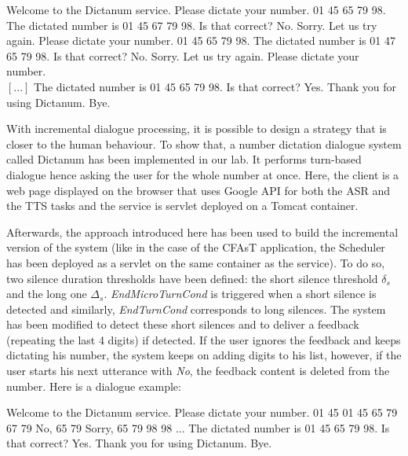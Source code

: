         \begin{dialogue}
        	 Welcome to the Dictanum service. Please dictate your number.
             01 45 65 79 98.
             The dictated number is 01 45 67 79 98. Is that correct?
             No.
             Sorry. Let us try again. Please dictate your number.
             01 45 65 79 98.
             The dictated number is 01 47 65 79 98. Is that correct?
             No.
             Sorry. Let us try again. Please dictate your number. \\
            $\left[...\right]$
             The dictated number is 01 45 65 79 98. Is that correct?
             Yes.
             Thank you for using Dictanum. Bye.
        \end{dialogue}
        
        With incremental dialogue processing, it is possible to design a strategy that is closer to the human behaviour. To show that, a number dictation dialogue system called Dictanum has been implemented in our lab. It performs turn-based dialogue hence asking the user for the whole number at once. Here, the client is a web page displayed on the browser that uses Google API for both the ASR and the TTS tasks and the service is servlet deployed on a Tomcat container.
        
        Afterwards, the approach introduced here has been used to build the incremental version of the system (like in the case of the CFAsT application, the Scheduler has been deployed as a servlet on the same container as the service). To do so, two silence duration thresholds have been defined: the short silence threshold $\delta_s$ and the long one $\Delta_s$. \textit{EndMicroTurnCond} is triggered when a short silence is detected and similarly, \textit{EndTurnCond} corresponds to long silences. The system has been modified to detect these short silences and to deliver a feedback (repeating the last 4 digits) if detected. If the user ignores the feedback and keeps dictating his number, the system keeps on adding digits to his list, however, if the user starts his next utterance with \textit{No}, the feedback content is deleted from the number. Here is a dialogue example:
        
        \begin{dialogue}
        	 Welcome to the Dictanum service. Please dictate your number.
             01 45
             01 45
             65 79
             67 79
             No, 65 79
             Sorry, 65 79
             98
             98
             ...
             The dictated number is 01 45 65 79 98. Is that correct?
             Yes.
             Thank you for using Dictanum. Bye.
        \end{dialogue}
        

